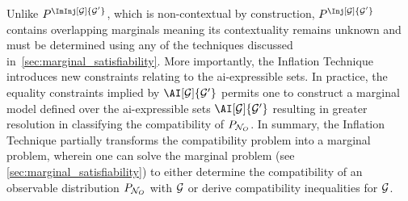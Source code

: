 \documentclass[aps, 10pt, english, twoside, pra, nofootinbib, tightenlines, longbibliography, superscriptaddress]{revtex4-1}
\begin{document}
    Unlike $\prob^{\ImInj[\graph]{\graph'}}$, which is non-contextual by construction, $\prob^{\Inj[\graph]{\graph'}}$ contains overlapping marginals meaning its contextuality remains unknown and must be determined using any of the techniques discussed in~\cref{sec:marginal_satisfiability}. More importantly, the Inflation Technique introduces new constraints relating to the ai-expressible sets. In practice, the equality constraints implied by $\AI[\graph]{\graph'}$ permits one to construct a marginal model defined over the ai-expressible sets $\AI[\graph]{\graph'}$ resulting in greater resolution in classifying the compatibility of $\prob[\nodes_O]$. In summary, the Inflation Technique partially transforms the compatibility problem into a marginal problem, wherein one can solve the marginal problem (see \cref{sec:marginal_satisfiability}) to either determine the compatibility of an observable distribution $\prob[\nodes_O]$ with $\mathcal{G}$ or derive compatibility inequalities for $\mathcal{G}$.



\end{document}
